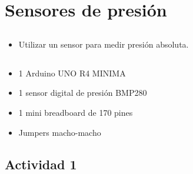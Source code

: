 \chapter{Sensores de presión}
\section{\obj}
\capacidad
\begin{itemize}
\item Utilizar un sensor para medir presión absoluta.
\end{itemize}

\section{\mat}
\begin{itemize}
\item 1 Arduino UNO R4 MINIMA
\item 1 sensor digital de presión BMP280
\item 1 mini breadboard de 170 pines
\item Jumpers macho-macho
\end{itemize}

\section{Actividad 1}
